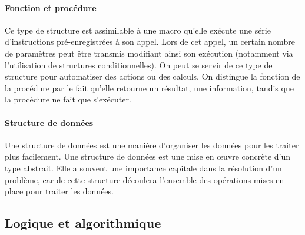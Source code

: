         \paragraph{Fonction et procédure}
            Ce type de structure est assimilable à une macro \cad qu'elle exécute une série d'instructions pré-enregistrées à son appel. Lors de cet appel, un certain nombre de paramètres peut être transmis modifiant ainsi son exécution (notamment via l'utilisation de structures conditionnelles). On peut se servir de ce type de structure pour automatiser des actions ou des calculs. On distingue la fonction de la procédure par le fait qu'elle retourne un résultat, une information, tandis que la procédure ne fait que s'exécuter.  
        \paragraph{Structure de données}
             Une structure de données est une manière d'organiser les données pour les traiter plus facilement. Une structure de données est une mise en œuvre concrète d'un type abstrait. Elle a souvent une importance capitale dans la résolution d'un problème, car de cette structure découlera l'ensemble des opérations mises en place pour traiter les données.
    \subsection{Logique et algorithmique}\label{sec:program-concept}
